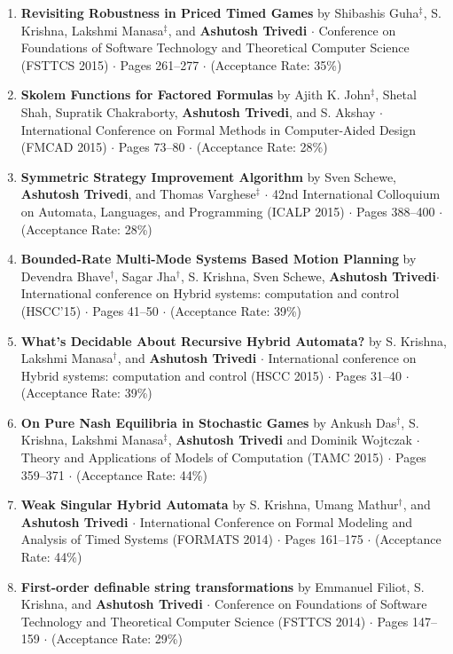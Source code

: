 \documentclass{article}
\begin{document}
\begin{enumerate}
\item
  {\bf Revisiting Robustness in Priced Timed Games}
  by Shibashis Guha${}^{\ddag}$, S. Krishna, Lakshmi Manasa${}^{\ddag}$, and {\bf Ashutosh Trivedi} $\cdot$ 
  Conference on Foundations of Software Technology and Theoretical Computer
  Science (FSTTCS 2015) $\cdot$ Pages 261--277 $\cdot$ (Acceptance Rate: 35\%)
\item
{\bf Skolem Functions for Factored Formulas} by
Ajith K. John${}^{\ddag}$, Shetal Shah, Supratik Chakraborty, {\bf Ashutosh Trivedi}, and  S. Akshay $\cdot$
International Conference on
Formal Methods in Computer-Aided Design (FMCAD 2015) $\cdot$ Pages 73--80
$\cdot$ (Acceptance Rate: 28\%)

\item
  {\bf Symmetric Strategy Improvement Algorithm} by 
  Sven Schewe, {\bf Ashutosh Trivedi}, and Thomas Varghese${}^{\ddag}$ $\cdot$
  42nd International Colloquium on Automata, Languages, and Programming (ICALP
  2015) $\cdot$ Pages 388--400
  $\cdot$ (Acceptance Rate: 28\%)

\item
  {\bf Bounded-Rate Multi-Mode Systems Based Motion Planning} by Devendra Bhave${}^{\dag}$,
  Sagar Jha${}^{\dag}$, S. Krishna, Sven Schewe, {\bf Ashutosh Trivedi}$\cdot$ 
  International conference on Hybrid systems: computation
  and control (HSCC'15) $\cdot$ Pages 41--50
  $\cdot$ (Acceptance Rate: 39\%)

\item
  {\bf What's Decidable About Recursive Hybrid Automata?} by S. Krishna,
  Lakshmi Manasa${}^{\dag}$, and {\bf Ashutosh Trivedi} $\cdot$ 
  International conference on Hybrid systems: computation
  and control (HSCC 2015) $\cdot$ Pages 31--40
  $\cdot$ (Acceptance Rate: 39\%)
  \item
  {\bf On Pure Nash Equilibria in Stochastic Games}  by Ankush Das${}^{\dag}$, 
  S. Krishna, Lakshmi Manasa${}^{\ddag}$, {\bf Ashutosh Trivedi} and Dominik Wojtczak $\cdot$ 
  Theory and Applications of Models of Computation (TAMC 2015) $\cdot$ Pages 359--371
  $\cdot$ (Acceptance Rate: 44\%)
  
\item
{\bf Weak Singular Hybrid Automata} by 
S. Krishna, Umang Mathur${}^{\dag}$, and {\bf Ashutosh Trivedi} $\cdot$  
International Conference on Formal Modeling and Analysis of
Timed Systems (FORMATS 2014) $\cdot$ Pages 161--175
$\cdot$ (Acceptance Rate: 44\%)

\item
{\bf First-order definable string transformations} by  
Emmanuel Filiot, S. Krishna, and {\bf Ashutosh Trivedi} $\cdot$ 
Conference on Foundations of Software Technology and
Theoretical Computer Science (FSTTCS 2014) $\cdot$ Pages 147--159
$\cdot$ (Acceptance Rate: 29\%)


\end{enumerate}
\end{document}
